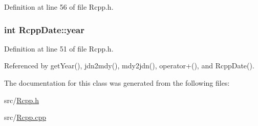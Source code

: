 Definition at line 56 of file Rcpp.h.\hypertarget{classRcppDate_8881f654ebf42cdf71fdcfce402f0cad}{
\subsubsection[{year}]{\setlength{\rightskip}{0pt plus 5cm}int {\bf RcppDate::year}}}
\label{classRcppDate_8881f654ebf42cdf71fdcfce402f0cad}




Definition at line 51 of file Rcpp.h.

Referenced by getYear(), jdn2mdy(), mdy2jdn(), operator+(), and RcppDate().

The documentation for this class was generated from the following files:\begin{CompactItemize}
\item 
src/\hyperlink{Rcpp_8h}{Rcpp.h}\item 
src/\hyperlink{Rcpp_8cpp}{Rcpp.cpp}\end{CompactItemize}
